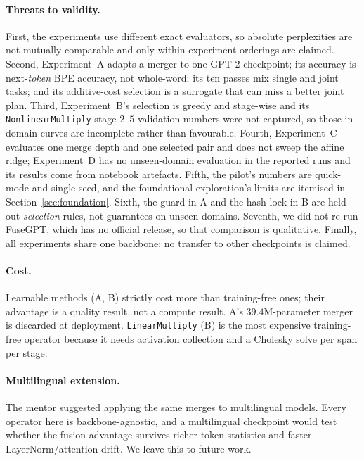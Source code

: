\documentclass[10pt,a4paper]{article}
\newcommand{\linop}{\texttt{LinearMultiply}}
\newcommand{\nlop}{\texttt{NonlinearMultiply}}
\begin{document}
\paragraph{Threats to validity.} First, the experiments use different exact
evaluators, so absolute perplexities are not mutually comparable and only
within-experiment orderings are claimed. Second, Experiment~A adapts a merger to
one GPT-2 checkpoint; its accuracy is next-\emph{token} BPE accuracy, not
whole-word; its ten passes mix single and joint tasks; and its additive-cost
selection is a surrogate that can miss a better joint plan. Third, Experiment~B's
selection is greedy and stage-wise and its \nlop{} stage-$2$--$5$ validation
numbers were not captured, so those in-domain curves are incomplete rather than
favourable. Fourth, Experiment~C evaluates one merge depth and one selected pair
and does not sweep the affine ridge; Experiment~D has no unseen-domain
evaluation in the reported runs and its results come from notebook artefacts.
Fifth, the pilot's numbers are quick-mode and single-seed, and the foundational
exploration's limits are itemised in Section~\ref{sec:foundation}. Sixth, the
guard in A and the hash lock in B are held-out \emph{selection} rules, not
guarantees on unseen domains. Seventh, we did not re-run FuseGPT, which has no
official release, so that comparison is qualitative. Finally, all experiments
share one backbone: no transfer to other checkpoints is claimed.

\paragraph{Cost.} Learnable methods (A, B) strictly cost more than training-free
ones; their advantage is a quality result, not a compute result. A's
$39.4$M-parameter merger is discarded at deployment. \linop{} (B) is the most
expensive training-free operator because it needs activation collection and a
Cholesky solve per span per stage.

\paragraph{Multilingual extension.} The mentor suggested applying the same
merges to multilingual models. Every operator here is backbone-agnostic, and a
multilingual checkpoint would test whether the fusion advantage survives richer
token statistics and faster LayerNorm/attention drift. We leave this to future
work.
\end{document}
